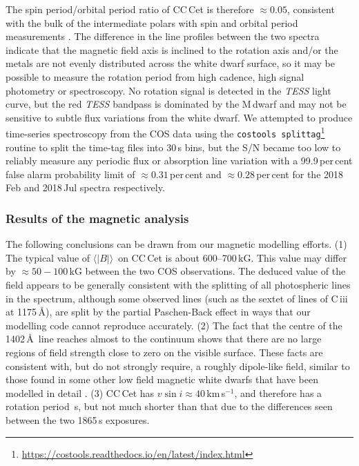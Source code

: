 \documentclass[fleqn,usenatbib]{mnras}
\newcommand{\bs}{\ensuremath{\langle \vert B \vert \rangle}}
\newcommand{\kms}{km\,s$^{-1}$}
\begin{document}
The spin period/orbital period ratio of CC\,Cet is therefore $\approx0.05$, consistent with the bulk of the intermediate polars with spin and orbital period measurements \citep{bernardinietal17-1}. The difference in the line profiles between the two spectra indicate that the magnetic field axis is inclined to the rotation axis and/or the metals are not evenly distributed across the white dwarf surface, so it may be possible to measure the rotation period from high cadence, high signal photometry or spectroscopy. No rotation signal is detected in the \textit{TESS} light curve, but the red \textit{TESS} bandpass is dominated by the M\,dwarf and may not be sensitive to subtle flux variations from the white dwarf. We attempted to produce time-series spectroscopy from the COS data using the \texttt{costools splittag}\footnote{\url{https://costools.readthedocs.io/en/latest/index.html}} routine to split the time-tag files into 30\,s bins, but the S/N became too low to reliably measure any periodic flux or absorption line variation with a 99.9\,per\,cent false alarm probability limit of $\approx0.31$\,per\,cent and $\approx0.28$\,per\,cent for the 2018\,Feb and 2018\,Jul spectra respectively.     

\subsubsection{Results of the magnetic analysis}

The following conclusions can be drawn from our magnetic modelling efforts. (1) The typical value of \bs\ on CC\,Cet is about 600--700\,kG. This value may differ by $\approx50-100$\,kG between the two COS observations. The deduced value of the field appears to be generally consistent with the splitting of all photospheric lines in the spectrum, although some observed lines (such as the sextet of lines of C\,{\sc iii} at 1175\,\AA), are split by the partial Paschen-Back effect in ways that our modelling code cannot reproduce accurately. (2) The fact that the centre of the 1402\,\AA\ line reaches almost to the continuum shows that there are no large regions of field strength close to zero on the visible surface. These facts are consistent with, but do not strongly require, a roughly dipole-like field, similar to those found in some other low field magnetic white dwarfs that have been modelled in detail \citep[e.g. WD\,2047+372: see][]{landstreetetal17-1}. (3) CC\,Cet has $v \sin i \approx 40$\,\kms, and therefore has a rotation period \,s, but not much shorter than that due to the differences seen between the two 1865\,s exposures. 
\end{document}
